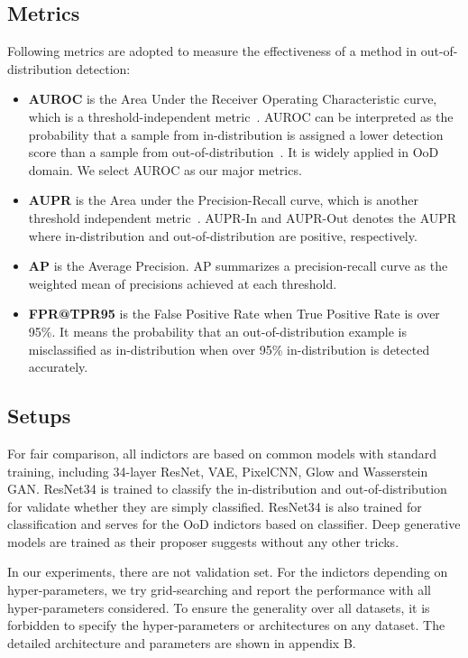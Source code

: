 \documentclass[letterpaper]{article} %
\begin{document}
\subsection{Metrics}
Following metrics are adopted to measure the effectiveness of a method in out-of-distribution detection:
\begin{itemize}
	\item \textbf{AUROC} is the Area Under the Receiver Operating Characteristic curve, which is a threshold-independent metric~\cite{davis2006relationship}. AUROC can be interpreted as the probability that a sample from in-distribution is assigned a lower detection score than a sample from out-of-distribution~\cite{fawcett2006introduction}. It is widely applied in OoD domain. We select AUROC as our major metrics. 
	\item \textbf{AUPR} is the Area under the Precision-Recall curve, which is another threshold independent metric~\cite{saito2015precision}. AUPR-In and AUPR-Out denotes the AUPR where in-distribution and out-of-distribution are positive, respectively.  
	\item \textbf{AP} is the Average Precision. AP summarizes a precision-recall curve as the weighted mean of precisions achieved at each threshold. 
	\item \textbf{FPR@TPR95} is the False Positive Rate when True Positive Rate is over 95\%. It means the probability that an out-of-distribution example is misclassified as in-distribution when over 95\% in-distribution is detected accurately.
\end{itemize} 

\subsection{Setups} 
For fair comparison, all indictors are based on common models with standard training, including 34-layer ResNet, VAE, PixelCNN, Glow and Wasserstein GAN. ResNet34 is trained to classify the in-distribution and out-of-distribution for validate whether they are simply classified. ResNet34 is also trained for classification and serves for the OoD indictors based on classifier. Deep generative models are trained as their proposer suggests without any other tricks. 

In our experiments, there are not validation set. For the indictors depending on hyper-parameters, we try grid-searching and report the performance with all hyper-parameters considered. To ensure the generality over all datasets, it is forbidden to specify the hyper-parameters or architectures on any dataset. 
The detailed architecture and parameters are shown in appendix B. 
\end{document}
